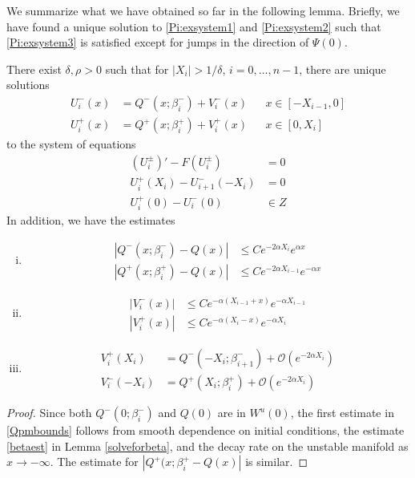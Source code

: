 \documentclass[thesis.tex]{subfiles}
\begin{document}
We summarize what we have obtained so far in the following lemma. Briefly, we have found a unique solution to \eqref{Pi:exsystem1} and \eqref{Pi:exsystem2} such that \eqref{Pi:exsystem3} is satisfied except for jumps in the direction of $\Psi(0)$.


\begin{lemma}\label{solvewithjumps}
There exist $\delta, \rho > 0$ such that for $|X_i| > 1/\delta$, $i = 0, \dots, n-1$, there are unique solutions
\begin{equation*}
\begin{aligned}
U_i^-(x) &= Q^-(x; \beta_i^-) + V_i^-(x) && x \in [-X_{i-1}, 0] \\
U_i^+(x) &= Q^+(x; \beta_i^+) + V_i^+(x) && x \in [0, X_i]
\end{aligned}
\end{equation*}
to the system of equations
\begin{equation}\label{systemwithjumpZ}
\begin{aligned}
(U_i^\pm)' - F(U_i^\pm) &= 0 \\
U_i^+(X_i) - U_{i+1}^-(-X_i) &= 0 \\
U_i^+(0) - U_i^-(0) &\in Z 
\end{aligned}
\end{equation}
In addition, we have the estimates
\begin{enumerate}[(i)]
\item 
\begin{equation}
\begin{aligned}\label{Qpmbounds}
|Q^-(x; \beta_i^-) - Q(x)| &\leq C e^{-2 \alpha X_i} e^{\alpha x} \\
|Q^+(x; \beta_i^+) - Q(x)| &\leq C e^{-2 \alpha X_{i-1}} e^{-\alpha x}
\end{aligned}
\end{equation}
\item
\begin{equation}\label{Vpmbounds}
\begin{aligned}
|V_i^-(x)| &\leq C e^{-\alpha(X_{i-1} + x)}e^{-\alpha X_{i-1}} \\
|V_i^+(x)| &\leq C e^{-\alpha(X_i - x)}e^{-\alpha X_i} 
\end{aligned}
\end{equation}
\item
\begin{equation}\label{VQpm}
\begin{aligned}
V_i^+(X_i) &= Q^-(-X_i; \beta_{i+1}^-) + \mathcal{O}(e^{-2 \alpha X_i}) \\
V_i^-(-X_i) &= Q^+(X_i; \beta_i^+) + \mathcal{O}(e^{-2 \alpha X_i})
\end{aligned}
\end{equation}
\end{enumerate}
\begin{proof}
Since both $Q^-(0; \beta_i^-)$ and $Q(0)$ are in $W^u(0)$, the first estimate in \eqref{Qpmbounds} follows from smooth dependence on initial conditions, the estimate \eqref{betaest} in Lemma \ref{solveforbeta},  and the decay rate on the unstable manifold as $x \rightarrow -\infty$. The estimate for $|Q^+(x; \beta_i^+ - Q(x)|$ is similar.


\end{proof}
\end{lemma}
\end{document}
